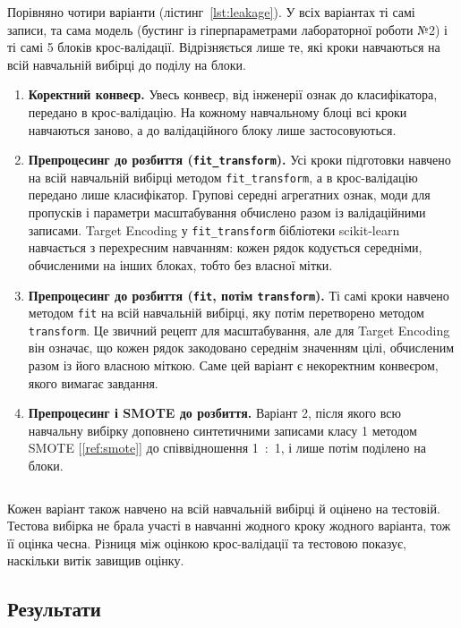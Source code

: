 \documentclass[14pt,a4paper]{extreport}
\begin{document}
Порівняно чотири варіанти (лістинг~\ref{lst:leakage}). У всіх варіантах ті самі записи, та сама модель (бустинг із гіперпараметрами лабораторної роботи №2) і ті самі 5 блоків крос-валідації. Відрізняється лише те, які кроки навчаються на всій навчальній вибірці до поділу на блоки.

\begin{enumerate}
\item \textbf{Коректний конвеєр.} Увесь конвеєр, від інженерії ознак до класифікатора, передано в крос-валідацію. На кожному навчальному блоці всі кроки навчаються заново, а до валідаційного блоку лише застосовуються.
\item \textbf{Препроцесинг до розбиття (\texttt{fit\_transform}).} Усі кроки підготовки навчено на всій навчальній вибірці методом \texttt{fit\_transform}, а в крос-валідацію передано лише класифікатор. Групові середні агрегатних ознак, моди для пропусків і параметри масштабування обчислено разом із валідаційними записами. Target Encoding у \texttt{fit\_transform} бібліотеки scikit-learn навчається з перехресним навчанням: кожен рядок кодується середніми, обчисленими на інших блоках, тобто без власної мітки.
\item \textbf{Препроцесинг до розбиття (\texttt{fit}, потім \texttt{transform}).} Ті самі кроки навчено методом \texttt{fit} на всій навчальній вибірці, яку потім перетворено методом \texttt{transform}. Це звичний рецепт для масштабування, але для Target Encoding він означає, що кожен рядок закодовано середнім значенням цілі, обчисленим разом із його власною міткою. Саме цей варіант є некоректним конвеєром, якого вимагає завдання.
\item \textbf{Препроцесинг і SMOTE до розбиття.} Варіант 2, після якого всю навчальну вибірку доповнено синтетичними записами класу 1 методом SMOTE [\ref{ref:smote}] до співвідношення 1~:~1, і лише потім поділено на блоки.
\end{enumerate}

\inputminted[firstline=64,lastline=92]{python}{../src/mk1/leakage.py}
\label{lst:leakage}

Кожен варіант також навчено на всій навчальній вибірці й оцінено на тестовій. Тестова вибірка не брала участі в навчанні жодного кроку жодного варіанта, тож її оцінка чесна. Різниця між оцінкою крос-валідації та тестовою показує, наскільки витік завищив оцінку.

\subsection{Результати}
\end{document}
